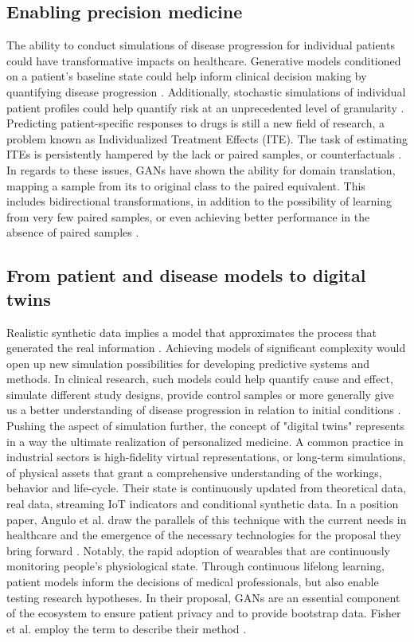 \subsection{Enabling precision medicine}
The ability to conduct simulations of disease progression for individual patients could have transformative impacts on healthcare. Generative models conditioned on a patient's baseline state could help inform clinical decision making by quantifying disease progression \cite{walsh2020generating, Fisher2019}. Additionally, stochastic simulations of individual patient profiles could help quantify risk at an unprecedented level of granularity \cite{Fisher2019}. Predicting patient-specific responses to drugs is still a new field of research, a problem known as Individualized Treatment Effects (ITE). The task of estimating ITEs is persistently hampered by the lack or paired samples, or counterfactuals \cite{Yoon2018-mo, chu2019treatment}. In regards to these issues, GANs have shown the ability for domain translation, mapping a sample from its to original class to the paired equivalent. This includes bidirectional transformations, in addition to the possibility of learning from very few paired samples, or even achieving better performance in the absence of paired samples \cite{Wolterink2017DeepMT}.
\subsection{From patient and disease models to digital twins}
Realistic synthetic data implies a model that approximates the process that generated the real information \cite{esteban2017real}. Achieving models of significant complexity would open up new simulation possibilities for developing predictive systems and methods. In clinical research, such models could help quantify cause and effect, simulate different study designs, provide control samples or more generally give us a better understanding of disease progression in relation to initial conditions \cite{Fisher2019, yahi2017generative, walsh2020generating}. Pushing the aspect of simulation further, the concept of "digital twins" represents in a way the ultimate realization of personalized medicine. A common practice in industrial sectors is high-fidelity virtual representations, or long-term simulations, of physical assets that grant a comprehensive understanding of the workings, behavior and life-cycle. Their state is continuously updated from theoretical data, real data, streaming IoT indicators and conditional synthetic data. In a position paper, Angulo et al. draw the parallels of this technique with the current needs in healthcare and the emergence of the necessary technologies for the proposal they bring forward \cite{angulo2019towards,Angulo_2020}. Notably, the rapid adoption of wearables that are continuously monitoring people's physiological state. Through continuous lifelong learning, patient models inform the decisions of medical professionals, but also enable testing research hypotheses. In their proposal, GANs are an essential component of the ecosystem to ensure patient privacy and to provide bootstrap data. Fisher et al. employ the term to describe their method \cite{walsh2020generating}.
